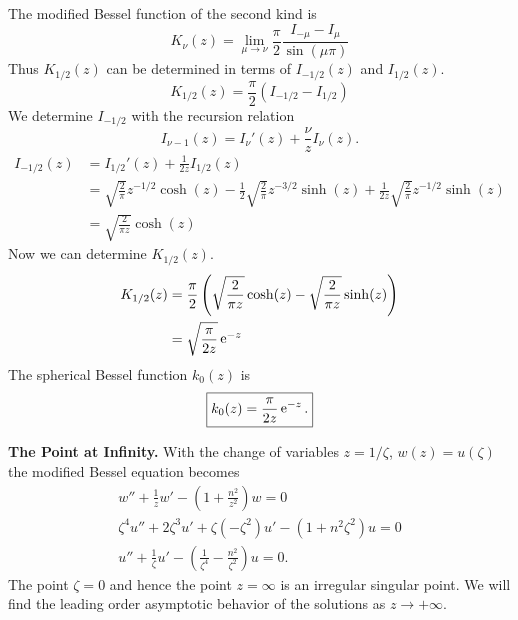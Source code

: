 {\begin{Solution}
  The modified Bessel function of the second kind is
  \[
  K_\nu(z) = \lim_{\mu \to \nu} 
  \frac{\pi}{2} \frac{ I_{-\mu} - I_\mu }{ \sin(\mu \pi ) }
  \]
  Thus $K_{1/2}(z)$ can be determined in terms of $I_{-1/2}(z)$ and 
  $I_{1/2}(z)$.
  \[
  K_{1/2}(z) = \frac{\pi}{2} \left( I_{-1/2} - I_{1/2} \right)
  \]
  We determine $I_{-1/2}$ with the recursion relation
  \[
  I_{\nu-1}(z) = I_\nu'(z) + \frac{\nu}{z} I_\nu(z).
  \]
  \begin{align*}
    I_{-1/2}(z)
    &= I_{1/2}'(z) + \frac{1}{2 z} I_{1/2}(z) 
    \\
    &= \sqrt{ \frac{2}{\pi} } z^{-1/2} \cosh(z)
    - \frac{1}{2} \sqrt{ \frac{2}{\pi} } z^{-3/2} \sinh(z)
    + \frac{1}{2 z} \sqrt{ \frac{2}{\pi} } z^{-1/2} \sinh(z) 
    \\
    &= \sqrt{ \frac{2}{\pi z} } \cosh(z)
  \end{align*}
  Now we can determine $K_{1/2}(z)$.
  \begin{align*}
    K_{1/2}(z) 
    &= \frac{\pi}{2} \left( \sqrt{ \frac{2}{\pi z} } \cosh(z) 
      - \sqrt{ \frac{2}{\pi z} } \sinh(z) \right) 
    \\
    &= \sqrt{ \frac{\pi}{2 z} } \mathop{\mathrm{e}}\nolimits^{-z}
  \end{align*}
  The spherical Bessel function $k_0(z)$ is
  \[
  \boxed{
    k_0(z) = \frac{\pi}{2 z} \mathop{\mathrm{e}}\nolimits^{-z}.
    }
  \]
\end{Solution}






\begin{Solution}
  \textbf{The Point at Infinity.}
  With the change of variables $z = 1/\zeta$, $w(z) = u(\zeta)$ the modified Bessel 
  equation becomes
  \begin{gather*}
    w'' + \frac{1}{z} w' - \left( 1 + \frac{n^2}{z^2} \right) w = 0 
    \\
    \zeta^4 u'' + 2 \zeta^3 u' + \zeta \left( - \zeta^2 \right) u'- \left( 1 + n^2 \zeta^2 \right) u = 0 
    \\
    u'' + \frac{1}{\zeta} u' - \left(\frac{1}{\zeta^4} - \frac{n^2}{\zeta^2}\right) u = 0.
  \end{gather*}
  The point $\zeta = 0$ and hence the point $z = \infty$ is an irregular singular
  point.  We will find the leading order asymptotic behavior of the solutions
  as $z \to +\infty$.


\end{Solution}}
